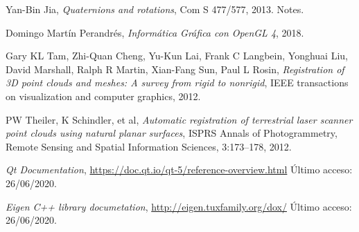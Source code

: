 \documentclass[a4paper,11pt]{book}
\begin{document}
\begin{thebibliography}{X}
	 Yan-Bin Jia, \textsl{Quaternions and rotations}, Com S 477/577, 2013.
	Notes.
		
	 Domingo Martín Perandrés, \textsl{Informática Gráfica con OpenGL 4}, 2018.
	
	 Gary KL Tam, Zhi-Quan Cheng, Yu-Kun Lai, Frank C Langbein, Yonghuai Liu, David Marshall, Ralph R Martin, Xian-Fang Sun, Paul L Rosin, \textsl{Registration of 3D point clouds and meshes: A survey from rigid to nonrigid}, IEEE transactions on visualization and computer graphics, 2012.
			
	 PW Theiler, K Schindler, et al, \textsl{Automatic registration of terrestrial laser scanner point clouds using natural planar surfaces}, ISPRS Annals of Photogrammetry, Remote Sensing and Spatial	Information Sciences, 3:173–178, 2012.
	
	 \textsl{Qt Documentation}, \url{https://doc.qt.io/qt-5/reference-overview.html} Último acceso: 26/06/2020.
	
	 \textsl{Eigen C++ library documetation}, \url{http://eigen.tuxfamily.org/dox/} Último acceso: 26/06/2020.
\end{thebibliography}

%
%
%
%
%
%
%
%
%
%
%
%
%
%
%
%
%
%
%
%
%
\end{document}
